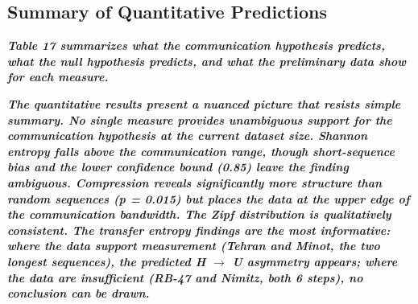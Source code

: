 \documentclass[11pt,letterpaper]{article}
\begin{document}
\subsection{Summary of Quantitative Predictions}

\textbf{\textit{Table 17 summarizes what the communication hypothesis predicts, what the null hypothesis predicts, and what the preliminary data show for each measure.}}


\begin{table}[H]
\centering
\small
{}
\caption*{\small\textit{Table 17. Summary of quantitative predictions: communication hypothesis vs. null hypothesis vs. preliminary data.}}
\end{table}


\textbf{\textit{The quantitative results present a nuanced picture that resists simple summary. No single measure provides unambiguous support for the communication hypothesis at the current dataset size. Shannon entropy falls above the communication range, though short-sequence bias and the lower confidence bound (0.85) leave the finding ambiguous. Compression reveals significantly more structure than random sequences (p = 0.015) but places the data at the upper edge of the communication bandwidth. The Zipf distribution is qualitatively consistent. The transfer entropy findings are the most informative: where the data support measurement (Tehran and Minot, the two longest sequences), the predicted H $\rightarrow$ U asymmetry appears; where the data are insufficient (RB-47 and Nimitz, both 6 steps), no conclusion can be drawn.}}
\end{document}
